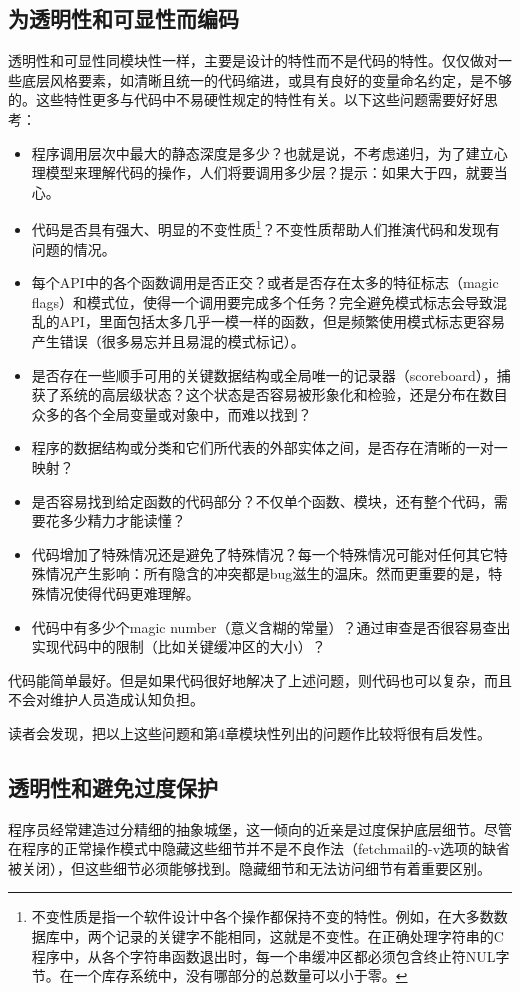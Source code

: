 \documentclass[12pt,oneside]{book}
\begin{document}
\begin{common-format}
\subsection{为透明性和可显性而编码}
透明性和可显性同模块性一样，主要是设计的特性而不是代码的特性。仅仅做对一些底层风格要素，如清晰且统一的代码缩进，或具有良好的变量命名约定，是不够的。这些特性更多与代码中不易硬性规定的特性有关。以下这些问题需要好好思考：
\begin{itemize}
\item 程序调用层次中最大的静态深度是多少？也就是说，不考虑递归，为了建立心理模型来理解代码的操作，人们将要调用多少层？提示：如果大于四，就要当心。
\item 代码是否具有强大、明显的不变性质\footnote{不变性质是指一个软件设计中各个操作都保持不变的特性。例如，在大多数数据库中，两个记录的关键字不能相同，这就是不变性。在正确处理字符串的C程序中，从各个字符串函数退出时，每一个串缓冲区都必须包含终止符NUL字节。在一个库存系统中，没有哪部分的总数量可以小于零。}？不变性质帮助人们推演代码和发现有问题的情况。
\item 每个API中的各个函数调用是否正交？或者是否存在太多的特征标志（magic flags）和模式位，使得一个调用要完成多个任务？完全避免模式标志会导致混乱的API，里面包括太多几乎一模一样的函数，但是频繁使用模式标志更容易产生错误（很多易忘并且易混的模式标记）。
\item 是否存在一些顺手可用的关键数据结构或全局唯一的记录器（scoreboard），捕获了系统的高层级状态？这个状态是否容易被形象化和检验，还是分布在数目众多的各个全局变量或对象中，而难以找到？
\item 程序的数据结构或分类和它们所代表的外部实体之间，是否存在清晰的一对一映射？
\item 是否容易找到给定函数的代码部分？不仅单个函数、模块，还有整个代码，需要花多少精力才能读懂？
\item 代码增加了特殊情况还是避免了特殊情况？每一个特殊情况可能对任何其它特殊情况产生影响：所有隐含的冲突都是bug滋生的温床。然而更重要的是，特殊情况使得代码更难理解。
\item 代码中有多少个magic number（意义含糊的常量）？通过审查是否很容易查出实现代码中的限制（比如关键缓冲区的大小）？
\end{itemize}

代码能简单最好。但是如果代码很好地解决了上述问题，则代码也可以复杂，而且不会对维护人员造成认知负担。

读者会发现，把以上这些问题和第4章模块性列出的问题作比较将很有启发性。


\subsection{透明性和避免过度保护}
程序员经常建造过分精细的抽象城堡，这一倾向的近亲是过度保护底层细节。尽管在程序的正常操作模式中隐藏这些细节并不是不良作法（fetchmail的-v选项的缺省被关闭），但这些细节必须能够找到。隐藏细节和无法访问细节有着重要区别。


\end{common-format}
\end{document}
